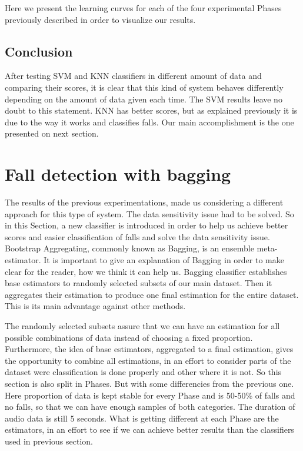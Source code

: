 \documentclass[10pt, conference, compsocconf]{IEEEtran}
\begin{document}
Here we present the learning curves for each of the four experimental Phases previously described in order to visualize our results. 



\subsection{Conclusion}

After testing SVM and KNN classifiers in different amount of data and comparing their scores, it is clear that this kind of system behaves differently depending on the amount of data given each time. The SVM results leave no doubt to this statement. KNN has better scores, but as explained previously it is due to the way it works and classifies falls. Our main accomplishment is the one presented on next section.

\section{Fall detection with bagging} \label{BaggingFall}
 

The results of the previous experimentations, made us considering a different approach for this type of system. The data sensitivity issue had to be solved. So in this Section, a new classifier is introduced in order to help us achieve better scores and easier classification of falls and solve the data sensitivity issue. Bootstrap Aggregating, commonly known as Bagging, is an ensemble meta-estimator. It is important to give an explanation of Bagging in order to make clear for the reader, how we think it can help us. Bagging classifier establishes base estimators to randomly selected subsets of our main dataset. Then it aggregates their estimation to produce one final estimation for the entire dataset. This is its main advantage against other methods. 

The randomly selected subsets assure that we can have an estimation for all possible combinations of data instead of choosing a fixed proportion. Furthermore, the idea of base estimators, aggregated to a final estimation, gives the opportunity to combine all estimations, in an effort to consider parts of the dataset were classification is done properly and other where it is not. 
So this section is also split in Phases. But with some differencies from the previous one. Here proportion of data is kept stable for every Phase and is 50-50\% of falls and no falls, so that we can have enough samples of both categories. The duration of audio data is still 5 seconds. 
What is getting different at each Phase are the estimators, in an effort to see if we can achieve better results than the classifiers used in previous section. 
\end{document}
